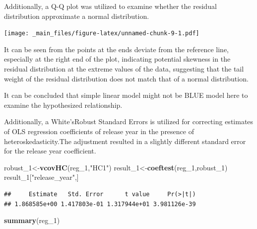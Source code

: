 \documentclass[
]{book}
\newenvironment{Shaded}{\begin{snugshade}}{\end{snugshade}}
\newcommand{\AttributeTok}[1]{\textcolor[rgb]{0.13,0.29,0.53}{#1}}
\newcommand{\DecValTok}[1]{\textcolor[rgb]{0.00,0.00,0.81}{#1}}
\newcommand{\FunctionTok}[1]{\textcolor[rgb]{0.13,0.29,0.53}{\textbf{#1}}}
\newcommand{\NormalTok}[1]{#1}
\newcommand{\OtherTok}[1]{\textcolor[rgb]{0.56,0.35,0.01}{#1}}
\newcommand{\SpecialCharTok}[1]{\textcolor[rgb]{0.81,0.36,0.00}{\textbf{#1}}}
\newcommand{\StringTok}[1]{\textcolor[rgb]{0.31,0.60,0.02}{#1}}
\begin{document}
Additionally, a Q-Q plot was utilized to examine whether the residual distribution approximate a normal distribution.

\begin{Shaded}
\end{Shaded}

\texttt{[image: \_main\_files/figure-latex/unnamed-chunk-9-1.pdf]}

It can be seen from the points at the ends deviate from the reference line, especially at the right end of the plot, indicating potential skewness in the residual distribution at the extreme values of the data, suggesting that the tail weight of the residual distribution does not match that of a normal distribution.

It can be concluded that simple linear model might not be BLUE model here to examine the hypothesized relationship.

Additionally, a White'sRobust Standard Errors is utilized for correcting estimates of OLS regression coefficients of release year in the presence of heteroskedasticity.The adjustment resulted in a slightly different standard error for the release year coefficient.

\begin{Shaded}
\begin{Highlighting}[]
\NormalTok{robust\_1}\OtherTok{\textless{}{-}}\FunctionTok{vcovHC}\NormalTok{(reg\_1,}\StringTok{"HC1"}\NormalTok{)}
\NormalTok{result\_1}\OtherTok{\textless{}{-}}\FunctionTok{coeftest}\NormalTok{(reg\_1,robust\_1)}
\NormalTok{result\_1[}\StringTok{"release\_year"}\NormalTok{,]}
\end{Highlighting}
\end{Shaded}

\begin{verbatim}
##     Estimate   Std. Error      t value     Pr(>|t|) 
## 1.868585e+00 1.417803e-01 1.317944e+01 3.981126e-39
\end{verbatim}

\begin{Shaded}
\begin{Highlighting}[]
\FunctionTok{summary}\NormalTok{(reg\_1)}
\end{Highlighting}
\end{Shaded}
\end{document}
